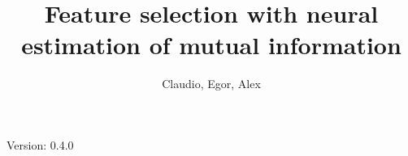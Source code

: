 \documentclass{mypaper}
\author{
Claudio,
Egor,
Alex
}
\title{Feature selection with neural estimation of mutual information}
\begin{document}
\maketitle

Version: 0.4.0







\end{document}
